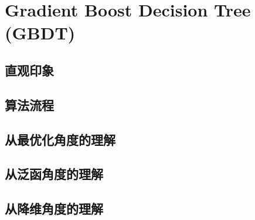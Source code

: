 
\section{Gradient Boost Decision Tree (GBDT)}
\subsection{直观印象}

\subsection{算法流程}

\subsection{从最优化角度的理解}

\subsection{从泛函角度的理解}


\subsection{从降维角度的理解}

